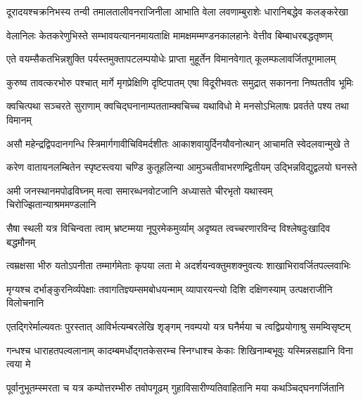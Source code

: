\fourlineindentedshloka
{दूरादयश्चक्रनिभस्य तन्वी}
{तमालतालीवनराजिनीला}
{आभाति वेला लवणाम्बुराशेः}
{धारानिबद्धेव कलङ्करेखा} %

\fourlineindentedshloka
{वेलानिलः केतकरेणुभिस्ते}
{सम्भावयत्याननमायताक्षि}
{मामक्षमम्मण्डनकालहानेः}
{वेत्तीव बिम्बाधरबद्धतृष्णम्} %

\fourlineindentedshloka
{एते वयम्सैकतभिन्नशुक्ति}
{पर्यस्तमुक्तापटलम्पयोधेः}
{प्राप्ता मुहूर्तेन विमानवेगात्}
{कूलम्फलावर्जितपूगमालम्} %

\fourlineindentedshloka
{कुरुष्व तावत्करभोरु पश्चात्}
{मार्गे मृगप्रेक्षिणि दृष्टिपातम्}
{एषा विदूरीभवतः समुद्रात्}
{सकानना निष्पततीव भूमिः} %

\fourlineindentedshloka
{क्वचित्पथा सञ्चरते सुराणाम्}
{क्वचिद्घनानाम्पतताम्क्वचिच्च}
{यथाविधो मे मनसोऽभिलाषः}
{प्रवर्तते पश्य तथा विमानम्} %

\fourlineindentedshloka
{असौ महेन्द्रद्विपदानगन्धि}
{स्त्रिमार्गगावीचिविमर्दशीतः}
{आकाशवायुर्दिनयौवनोत्थान्}
{आचामति स्वेदलवान्मुखे ते} %

\fourlineindentedshloka
{करेण वातायनलम्बितेन}
{स्पृष्टस्त्वया चण्डि कुतूहलिन्या}
{आमुञ्चतीवाभरणम्द्वितीयम्}
{उद्भिन्नविद्युद्वलयो घनस्ते} %

\fourlineindentedshloka
{अमी जनस्थानमपोढविघ्नम्}
{मत्वा समारब्धनवोटजानि}
{अध्यासते चीरभृतो यथास्वम्}
{चिरोज्झितान्याश्रममण्डलानि} %

\fourlineindentedshloka
{सैषा स्थली यत्र विचिन्वता त्वाम्}
{भ्रष्टम्मया नूपुरमेकमुर्व्याम्}
{अदृष्यत त्वच्चरणारविन्द}
{विश्लेषदुःखादिव बद्धमौनम्} %

\fourlineindentedshloka
{त्वम्रक्षसा भीरु यतोऽपनीता}
{तम्मार्गमेताः कृपया लता मे}
{अदर्शयन्वक्तुमशक्नुवत्यः}
{शाखाभिरावर्जितपल्लवाभिः} %

\fourlineindentedshloka
{मृग्यश्च दर्भाङ्कुरनिर्व्यपेक्षाः}
{तवागतिज्ञ्यम्समबोधयन्माम्}
{व्यापारयन्त्यो दिशि दक्षिणस्याम्}
{उत्पक्षराजीनि विलोचनानि} %

\fourlineindentedshloka
{एतद्गिरेर्माल्यवतः पुरस्तात्}
{आविर्भत्यम्बरलेखि शृङ्गम्}
{नवम्पयो यत्र घनैर्मया च}
{त्वद्विप्रयोगाश्रु समम्विसृष्टम्} %

\fourlineindentedshloka
{गन्धश्च धाराहतपल्वलानाम्}
{कादम्बमर्धोद्गतकेसरम्च}
{स्निग्धाश्च केकाः शिखिनाम्बभूवुः}
{यस्मिन्नसह्यानि विना त्वया मे} %

\fourlineindentedshloka
{पूर्वानुभूतम्स्मरता च यत्र}
{कम्पोत्तरम्भीरु तवोपगूढम्}
{गुहाविसारीण्यतिवाहितानि}
{मया कथञ्चिद्घनगर्जितानि} %

